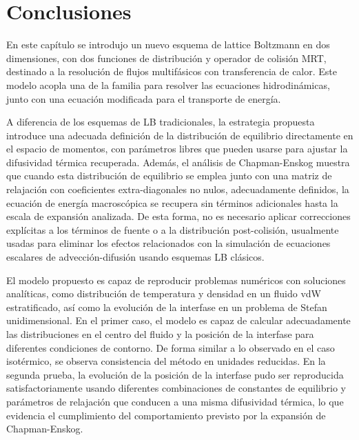 \FloatBarrier




\section{Conclusiones}

En este cap\'itulo se introdujo un nuevo esquema de lattice Boltzmann en dos dimensiones, con dos funciones de distribuci\'on y operador de colisi\'on MRT, destinado a la resoluci\'on de flujos multif\'asicos con transferencia de calor. Este modelo acopla una \lbe{} de la familia \pp{} para resolver las ecuaciones hidrodin\'amicas, junto con una ecuaci\'on modificada para el transporte de energ\'ia.

A diferencia de los esquemas de LB tradicionales, la estrategia propuesta introduce una adecuada definici\'on de la distribuci\'on de equilibrio directamente en el espacio de momentos, con par\'ametros libres que pueden usarse para ajustar la difusividad t\'ermica recuperada. Adem\'as, el an\'alisis de Chapman-Enskog muestra que cuando esta distribuci\'on de equilibrio se emplea junto con una matriz de relajaci\'on con coeficientes extra-diagonales no nulos, adecuadamente definidos, la ecuaci\'on de energ\'ia macrosc\'opica se recupera sin t\'erminos adicionales hasta la escala de expansi\'on analizada. De esta forma, no es necesario aplicar correcciones expl\'icitas a los t\'erminos de fuente o a la distribuci\'on post-colisi\'on, usualmente usadas para eliminar los efectos relacionados con la simulaci\'on de ecuaciones escalares de advecci\'on-difusi\'on usando esquemas LB cl\'asicos.

El modelo propuesto es capaz de reproducir problemas num\'ericos con soluciones anal\'iticas, como distribuci\'on de temperatura y densidad en un fluido vdW estratificado, as\'i como la evoluci\'on de la interfase en un problema de Stefan unidimensional. En el primer caso, el modelo es capaz de calcular adecuadamente las distribuciones en el centro del fluido y la posici\'on de la interfase para diferentes condiciones de contorno. De forma similar a lo observado en el caso isot\'ermico, se observa consistencia del m\'etodo en unidades reducidas. En la segunda prueba, la evoluci\'on de la posici\'on de la interfase pudo ser reproducida satisfactoriamente usando diferentes combinaciones de constantes de equilibrio y par\'ametros de relajaci\'on que conducen a una misma difusividad t\'ermica, lo que evidencia el cumplimiento del comportamiento previsto por la expansi\'on de Chapman-Enskog.

